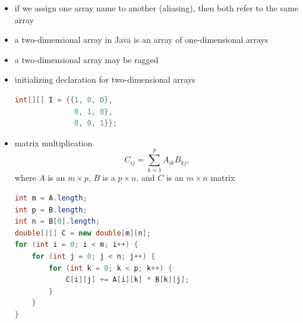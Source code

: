 \documentclass[8pt,a4paper,compress]{beamer}
\begin{document}
\begin{frame}[fragile]
\begin{itemize}
\item if we assign one array name to another (aliasing), then both refer to the same array

\item a two-dimensional array in Java is an array of one-dimensional arrays

\item a two-dimensional array may be ragged

\item initializing declaration for two-dimensional arrays
\begin{lstlisting}[language=Java]
int[][] I = {{1, 0, 0}, 
              0, 1, 0}, 
              0, 0, 1}};
\end{lstlisting}

\item matrix multiplication $$C_{ij}=\sum_{k=1}^{p} A_{ik}B_{kj},$$ where $A$ is an $m\times p$, $B$ is a $p \times n$, and $C$ is an $m\times n$ matrix
\begin{lstlisting}[language=Java]
int m = A.length;
int p = B.length;
int n = B[0].length;
double[][] C = new double[m][n];
for (int i = 0; i < m; i++) {
    for (int j = 0; j < n; j++) {
        for (int k = 0; k < p; k++) {
            C[i][j] += A[i][k] * B[k][j];
        }
    }
}
\end{lstlisting}

\end{itemize}
\end{frame}
\end{document}
